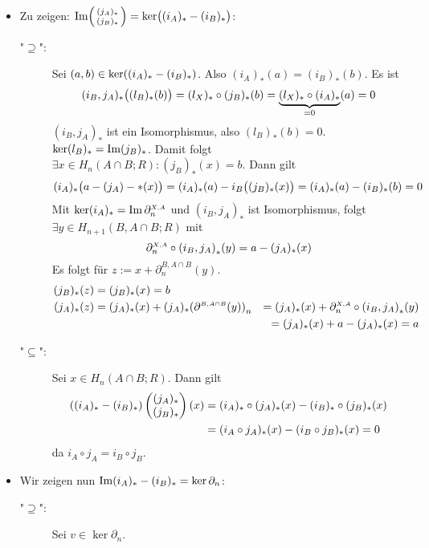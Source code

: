 \begin{itemize}
	\item Zu zeigen: $\im \begin{psmallmatrix} (j_A)_* \\ (j_B)_* \end{psmallmatrix} = \ker \enbrace[\big]{(i_A)_* - (i_B)_*} $: 
	\begin{description}
		\item["$\supseteq $":] Sei $(a,b) \in \ker \enbrace*{(i_A)_* - (i_B)_*}$. Also $(i_A)_*(a) = (i_B)_*(b)$. Es ist 
		\[
			(i_B,j_A)_* \enbrace[\big]{(l_B)_*(b)} = (l_X)_* \circ (j_B)_* (b) = \underbrace{(l_X)_* \circ (i_A)_*}_{=0}(a)= 0 
		\]
		$(i_B,j_A)_*$ ist ein Isomorphismus, also $(l_B)_*(b)=0$. $\ker (l_B)_* = \im (j_B)_*$. Damit folgt $\exists x \in H_n(A \cap B;R) : (j_B)_*(x)=b$. Dann gilt
		\[
			(i_A)_* \enbrace[\big]{a - (j_A)-*(x)} = (i_A)_*(a) - i_B \enbrace[\big]{(j_B)_* (x)} = (i_A)_*(a) - (i_B)_* (b) = 0  
		\]
		Mit $\ker (i_A)_*  =\im \rand{X,A}_n$ und $(i_B,j_A)_*$ ist Isomorphismus, folgt $\exists y \in H_{n+1}(B,A\cap B;R)$ mit 
		\[
			\rand{X,A}_n \circ  \enbrace*{i_B,j_A}_* (y) = a - (j_A)_*(x) 
		\]
		Es folgt für $z := x + \partial_n^{B,A \cap B}(y)$.
		\begin{align*}
			(j_B)_*(z) & =(j_B)_*(x) = b \\
			(j_A)_*(z) &= (j_A)_*(x) + (j_A)_* \enbrace*{\rand{B,A \cap B}(y)}_n &= (j_A)_*(x) + \rand{X,A}_n \circ  \enbrace*{i_B, j_A}_*(y) \\ 
			&&= (j_A)_*(x) + a - (j_A)_*(x) = a  
		\end{align*}
		\item["$\subseteq$":] Sei $x \in H_n(A\cap B;R)$. Dann gilt
		\begin{align*}
			\enbrace*{(i_A)_* - (i_B)_*} \begin{pmatrix}
				(j_A)_* \\ (j_B)_*
			\end{pmatrix}  (x) &= (i_A)_* \circ (j_A)_* (x) - (i_B)_* \circ (j_B)_*(x) \\
			&= (i_A \circ j_A)_* (x) - (i_B \circ j_B)_* (x) = 0
		\end{align*}
		da $i_A \circ j_A = i_B \circ j_B$.
	\end{description}
	\item Wir zeigen nun $\im (i_A)_* - (i_B)_* = \ker \partial_n$:
	\begin{description}
		\item["$\supseteq$":] Sei $v \in \ker \partial_n$. 

\end{description}
\end{itemize}
